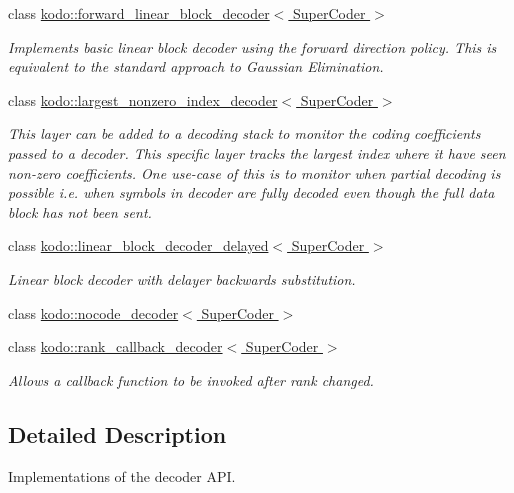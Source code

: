 \begin{DoxyCompactItemize}
class \hyperlink{classkodo_1_1forward__linear__block__decoder}{kodo\-::forward\-\_\-linear\-\_\-block\-\_\-decoder$<$ Super\-Coder $>$}
\begin{DoxyCompactList}\small\item\em Implements basic linear block decoder using the forward direction policy. This is equivalent to the standard approach to Gaussian Elimination. \end{DoxyCompactList}\item 
class \hyperlink{classkodo_1_1largest__nonzero__index__decoder}{kodo\-::largest\-\_\-nonzero\-\_\-index\-\_\-decoder$<$ Super\-Coder $>$}
\begin{DoxyCompactList}\small\item\em This layer can be added to a decoding stack to monitor the coding coefficients passed to a decoder. This specific layer tracks the largest index where it have seen non-\/zero coefficients. One use-\/case of this is to monitor when partial decoding is possible i.\-e. when symbols in decoder are fully decoded even though the full data block has not been sent. \end{DoxyCompactList}\item 
class \hyperlink{classkodo_1_1linear__block__decoder__delayed}{kodo\-::linear\-\_\-block\-\_\-decoder\-\_\-delayed$<$ Super\-Coder $>$}
\begin{DoxyCompactList}\small\item\em Linear block decoder with delayer backwards substitution. \end{DoxyCompactList}\item 
class \hyperlink{classkodo_1_1nocode__decoder}{kodo\-::nocode\-\_\-decoder$<$ Super\-Coder $>$}
\item 
class \hyperlink{classkodo_1_1rank__callback__decoder}{kodo\-::rank\-\_\-callback\-\_\-decoder$<$ Super\-Coder $>$}
\begin{DoxyCompactList}\small\item\em Allows a callback function to be invoked after rank changed. \end{DoxyCompactList}\end{DoxyCompactItemize}


\subsection{Detailed Description}
Implementations of the decoder A\-P\-I. 